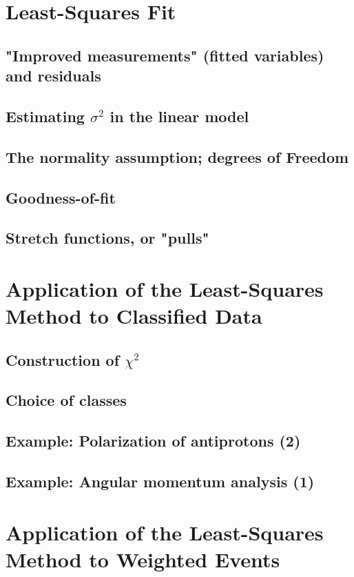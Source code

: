 \documentclass[../main.tex]{subfiles}
\begin{document}
\section{Least-Squares Fit} \label{sec:10.4}
\subsection{"Improved measurements" (fitted variables) and residuals} \label{sec:10.4.1}
\subsection{Estimating $\sigma^2$ in the linear model} \label{sec:10.4.2}
\subsection{The normality assumption; degrees of Freedom} \label{sec:10.4.3}
\subsection{Goodness-of-fit} \label{sec:10.4.4}
\subsection{Stretch functions, or "pulls"} \label{sec:10.4.5}

\section{Application of the Least-Squares Method to Classified Data} \label{sec:10.5}
\subsection{Construction of $\chi^2$} \label{sec:10.5.1}
\subsection{Choice of classes} \label{sec:10.5.2}
\subsection{Example: Polarization of antiprotons (2)} \label{sec:10.5.3}
\subsection{Example: Angular momentum analysis (1)} \label{sec:10.5.4}

\section{Application of the Least-Squares Method to Weighted Events} \label{sec:10.6}
\end{document}
